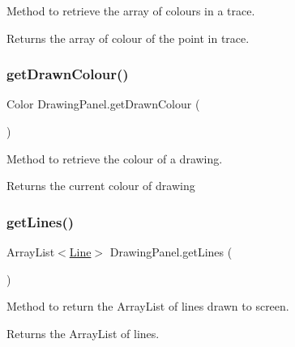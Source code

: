 Method to retrieve the array of colours in a trace. 

\begin{DoxyReturn}{Returns}
the array of colour of the point in trace. 
\end{DoxyReturn}
\mbox{\label{class_drawing_panel_ae0c2b7deb6ba8eae624e58c850a3a559}} 
\subsubsection{\texorpdfstring{get\+Drawn\+Colour()}{getDrawnColour()}}
{\footnotesize\ttfamily Color Drawing\+Panel.\+get\+Drawn\+Colour (\begin{DoxyParamCaption}{ }\end{DoxyParamCaption})}



Method to retrieve the colour of a drawing. 

\begin{DoxyReturn}{Returns}
the current colour of drawing 
\end{DoxyReturn}
\mbox{\label{class_drawing_panel_a3f8dc5d1f652dd58859ca98dce3e325b}} 
\subsubsection{\texorpdfstring{get\+Lines()}{getLines()}}
{\footnotesize\ttfamily Array\+List$<$\hyperlink{class_line}{Line}$>$ Drawing\+Panel.\+get\+Lines (\begin{DoxyParamCaption}{ }\end{DoxyParamCaption})}



Method to return the Array\+List of lines drawn to screen. 

\begin{DoxyReturn}{Returns}
the Array\+List of lines. 
\end{DoxyReturn}
\mbox{\label{class_drawing_panel_a77c3fd72e4c60f65d043ff01e7a8802d}} 
